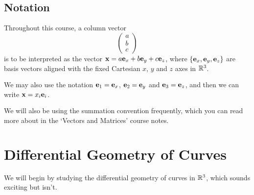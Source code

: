 \documentclass[a4paper]{scrreprt}
\begin{document}



\section{Notation}

Throughout this course, a column vector
$$
\begin{pmatrix}
a \\ b\\ c
\end{pmatrix}
$$
is to be interpreted as the vector $\mathbf{x} = a \mathbf{e}_x + b \mathbf{e}_y + c\mathbf{e}_z$, where $\{\mathbf{e}_x, \mathbf{e}_y, \mathbf{e}_z\}$ are basis vectors aligned with the fixed Cartesian $x$, $y$ and $z$ axes in $\mathbb{R}^3$.

\begin{center}
\end{center}

We may also use the notation $\mathbf{e}_1 = \mathbf{e}_x$, $\mathbf{e}_2 = \mathbf{e}_y$ and $\mathbf{e}_3 = \mathbf{e}_z$, and then we can write $\mathbf{x} = x_i \mathbf{e}_i$.

We will also be using the summation convention frequently, which you can read more about in the `Vectors and Matrices' course notes.

\clearpage


\chapter{Differential Geometry of Curves}

We will begin by studying the differential geometry of curves in $\mathbb{R}^3$, which sounds exciting but isn't.
\end{document}
